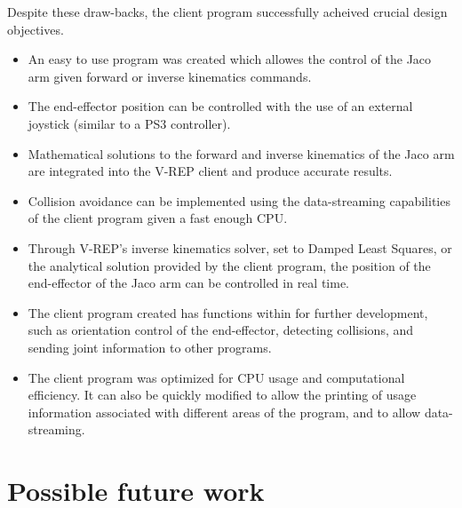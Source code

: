 \documentclass[12pt,openany,a4paper]{book}
\begin{document}
Despite these draw-backs, the client program successfully acheived crucial design objectives.

\begin{itemize}
	\item An easy to use program was created which allowes the control of the Jaco arm given forward or inverse kinematics commands.
	\item The end-effector position can be controlled with the use of an external joystick (similar to a PS3 controller).
	\item Mathematical solutions to the forward and inverse kinematics of the Jaco arm are integrated into the V-REP client and produce accurate results.
	\item Collision avoidance can be implemented using the data-streaming capabilities of the client program given a fast enough CPU.
	\item Through V-REP's inverse kinematics solver, set to Damped Least Squares, or the analytical solution provided by the client program, the position of the end-effector of the Jaco arm can be controlled in real time.
	\item The client program created has functions within for further development, such as orientation control of the end-effector, detecting collisions, and sending joint information to other programs.
	\item The client program was optimized for CPU usage and computational efficiency. It can also be quickly modified to allow the printing of usage information associated with different areas of the program, and to allow data-streaming.
\end{itemize}


\section{Possible future work}






\appendix


\newpage
{}
\mbox{}
\newpage

\end{document}
